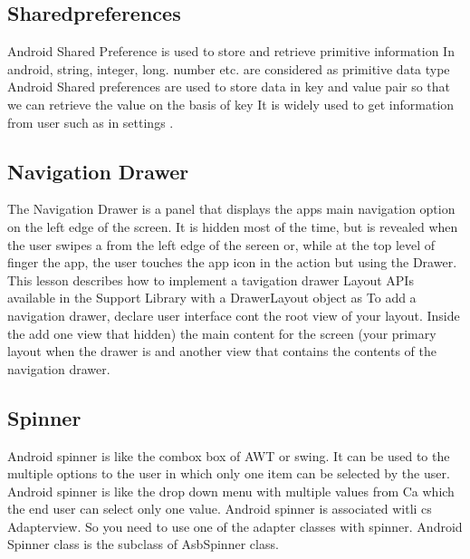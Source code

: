 \documentclass[twoside,a4paper,16pt]{book}
\begin{document}
\begin{itemize}
\begin{enumerate}
\begin{enumerate}
\subsection{Sharedpreferences}
 Android Shared Preference is used to store and retrieve primitive information In android, string, integer, long. number etc. are considered as primitive data type Android Shared preferences are used to store data in key and value pair so that we can retrieve the value on the basis of key It is widely used to get information from user such as in settings .\\

\subsection{Navigation Drawer}
The Navigation Drawer is a panel that displays the apps main navigation option on the left edge of the screen. It is hidden most of the time, but is revealed when the user swipes a from the left edge of the sereen or, while at the top level of finger the app, the user touches the app icon in the action but using the Drawer.\\
 This lesson describes how to implement a tavigation drawer Layout APIs available in the Support Library with a DrawerLayout object as To add a navigation drawer, declare user interface cont the root view of your layout. Inside the add one view that hidden) the main content for the screen (your primary layout when the drawer is and another view that contains the contents of the navigation drawer.\\

\subsection{Spinner}
Android spinner is like the combox box of AWT or swing. It can be used to the multiple options to the user in which only one item can be selected by the user. Android spinner is like the drop down menu with multiple values from Ca which the end user can select only one value. Android spinner is associated witli cs Adapterview. So you need to use one of the adapter classes with spinner. Android Spinner class is the subclass of AsbSpinner class.\\



\end{enumerate}
\end{enumerate}
\end{itemize}
\end{document}
